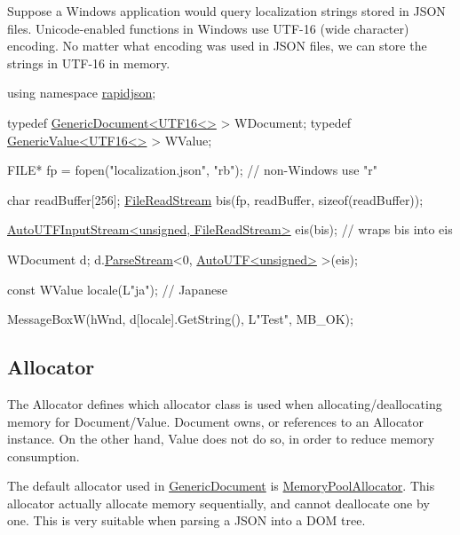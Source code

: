 Suppose a Windows application would query localization strings stored in J\+S\+ON files. Unicode-\/enabled functions in Windows use U\+T\+F-\/16 (wide character) encoding. No matter what encoding was used in J\+S\+ON files, we can store the strings in U\+T\+F-\/16 in memory.


\begin{DoxyCode}
\textcolor{keyword}{using namespace }\hyperlink{namespacerapidjson}{rapidjson};

\textcolor{keyword}{typedef} \hyperlink{class_generic_document}{GenericDocument<UTF16<>} > WDocument;
\textcolor{keyword}{typedef} \hyperlink{class_generic_value}{GenericValue<UTF16<>} > WValue;

FILE* fp = fopen(\textcolor{stringliteral}{"localization.json"}, \textcolor{stringliteral}{"rb"}); \textcolor{comment}{// non-Windows use "r"}

\textcolor{keywordtype}{char} readBuffer[256];
\hyperlink{class_file_read_stream}{FileReadStream} bis(fp, readBuffer, \textcolor{keyword}{sizeof}(readBuffer));

\hyperlink{class_auto_u_t_f_input_stream}{AutoUTFInputStream<unsigned, FileReadStream>} eis(bis);  \textcolor{comment}{//
       wraps bis into eis}

WDocument d;
d.\hyperlink{class_generic_document_afe94c0abc83a20f2d7dc1ba7677e6238}{ParseStream}<0, \hyperlink{struct_auto_u_t_f}{AutoUTF<unsigned>} >(eis);

\textcolor{keyword}{const} WValue locale(L\textcolor{stringliteral}{"ja"}); \textcolor{comment}{// Japanese}

MessageBoxW(hWnd, d[locale].GetString(), L\textcolor{stringliteral}{"Test"}, MB\_OK);
\end{DoxyCode}
\hypertarget{md_Cadriciel_Commun_Externe_RapidJSON_doc_internals_Allocator}{}\subsection{Allocator}\label{md_Cadriciel_Commun_Externe_RapidJSON_doc_internals_Allocator}
The {\ttfamily Allocator} defines which allocator class is used when allocating/deallocating memory for {\ttfamily Document}/{\ttfamily Value}. {\ttfamily Document} owns, or references to an {\ttfamily Allocator} instance. On the other hand, {\ttfamily Value} does not do so, in order to reduce memory consumption.

The default allocator used in {\ttfamily \hyperlink{class_generic_document}{Generic\+Document}} is {\ttfamily \hyperlink{class_memory_pool_allocator}{Memory\+Pool\+Allocator}}. This allocator actually allocate memory sequentially, and cannot deallocate one by one. This is very suitable when parsing a J\+S\+ON into a D\+OM tree.

